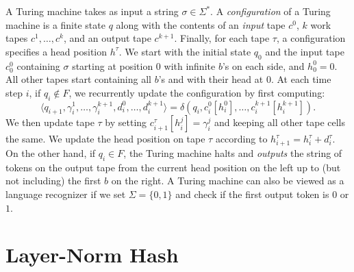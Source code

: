 A Turing machine takes as input a string $\sigma \in \Sigma^*$.
A \emph{configuration} of a Turing machine is a finite state $q$ along with the contents of an \emph{input} tape $c^0$, $k$ work tapes $c^1, \ldots, c^k$, and an output tape $c^{k+1}$. Finally, for each tape $\tau$, a configuration specifies a head position $h^\tau$.
We start with the initial state $q_0$ and the input tape $c^0_0$ containing $\sigma$ starting at position $0$ with infinite $b$'s on each side, and $h^0_0 = 0$.
All other tapes start containing all $b$'s and with their head at $0$. 
At each time step $i$, if $q_i \not\in F$, we recurrently update the configuration by first computing:
\begin{equation*}
    \langle q_{i+1}, \gamma^1_i, \ldots, \gamma^{k+1}_i, d^0_i, \ldots, d^{k+1}_i \rangle = \delta(q_i, c^0_i[h^0_i], \ldots, c^{k+1}_i[h^{k+1}_i]) .
\end{equation*}
We then update tape $\tau$ by setting $c^\tau_{i+1}[h^j_i] = \gamma^j_i$ and keeping all other tape cells the same. We update the head position on tape $\tau$ according to
$h^\tau_{i+1} = h^\tau_i + d^\tau_i$.
% 
On the other hand, if $q_i \in F$, the Turing machine halts and \emph{outputs} the string of tokens on the output tape from the current head position on the left up to (but not including) the first $b$ on the right.
% 
A Turing machine can also be viewed as a language recognizer if we set $\Sigma = \{0, 1\}$ and check if the first output token is $0$ or $1$.

\section{Layer-Norm Hash} \label{sec:lnorm-proof}

\lnormcanonical*

